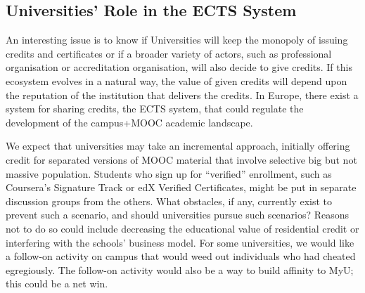 \subsection{Universities' Role in the ECTS System}


An interesting issue is to know if Universities will keep the monopoly
of issuing credits and certificates or if a broader variety of actors,
such as professional organisation or accreditation organisation, will
also decide to give credits.  If this ecosystem evolves in a natural
way, the value of given credits will depend upon the reputation of the
institution that delivers the credits. In Europe, there exist a system
for sharing credits, the ECTS system, that could regulate the
development of the campus+MOOC academic landscape.


We expect that universities may take an
incremental approach, initially offering
credit for separated versions of MOOC material that involve selective
big but not massive population. Students who sign up for ``verified''
enrollment, such as Coursera's Signature Track or edX Verified
Certificates, might be put
in separate discussion groups from the others.  
What obstacles, if any, currently exist to prevent such a scenario, and
should universities pursue such scenarios?
Reasons not to do so could include decreasing the educational value of
residential credit or interfering with the schools' business model.  For some
universities, we would like a follow-on activity on campus that would
weed out individuals who had cheated egregiously.  The follow-on
activity would also be a way to build affinity to MyU; this could be a
net win.
 


